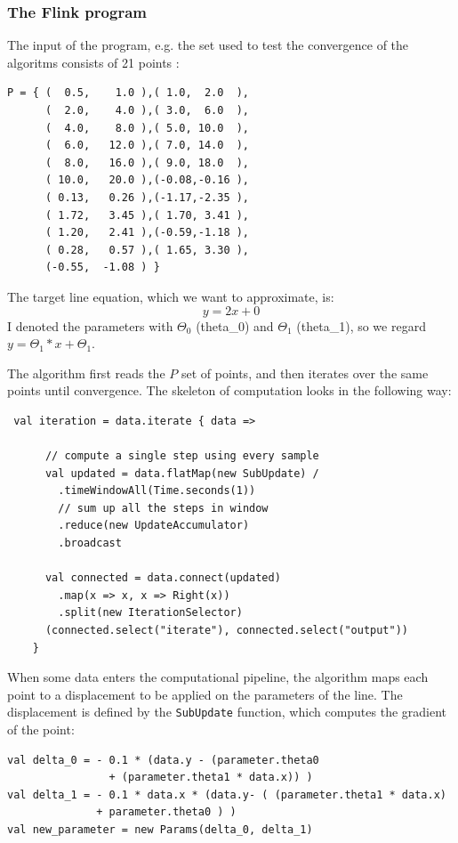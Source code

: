 \subsubsection{The Flink program}
The input of the program, e.g. the set used to test the convergence of the algoritms consists of 21 points :

{\small
\begin{verbatim}
P = { (  0.5,    1.0 ),( 1.0,  2.0  ),
      (  2.0,    4.0 ),( 3.0,  6.0  ),
      (  4.0,    8.0 ),( 5.0, 10.0  ),
      (  6.0,   12.0 ),( 7.0, 14.0  ),
      (  8.0,   16.0 ),( 9.0, 18.0  ),
      ( 10.0,   20.0 ),(-0.08,-0.16 ),
      ( 0.13,   0.26 ),(-1.17,-2.35 ),
      ( 1.72,   3.45 ),( 1.70, 3.41 ),
      ( 1.20,   2.41 ),(-0.59,-1.18 ),
      ( 0.28,   0.57 ),( 1.65, 3.30 ),
      (-0.55,  -1.08 ) }
\end{verbatim}
}

The target line equation, which we want to approximate, is:
\begin{equation}
 y=2x+0
\end{equation}
I denoted the parameters with $\Theta_0$ (theta\_0) and $\Theta_1$ (theta\_1), so we regard $y = \Theta_1*x+ \Theta_1$.

The algorithm first reads the $P$ set of points, and then iterates over the same points until convergence. The skeleton of computation looks in the following way:

{\small
\begin{verbatim}
 val iteration = data.iterate { data =>
      
      // compute a single step using every sample
      val updated = data.flatMap(new SubUpdate) /
        .timeWindowAll(Time.seconds(1))
        // sum up all the steps in window
        .reduce(new UpdateAccumulator) 
        .broadcast

      val connected = data.connect(updated)
        .map(x => x, x => Right(x))
        .split(new IterationSelector)
      (connected.select("iterate"), connected.select("output"))
    }
\end{verbatim}
}


When some data enters the computational pipeline, the algorithm maps each point to a displacement to be applied on the parameters of the line. The displacement is defined by the \verb:SubUpdate: function, which computes the gradient of the point:

{
\begin{verbatim}
val delta_0 = - 0.1 * (data.y - (parameter.theta0 
                + (parameter.theta1 * data.x)) )
val delta_1 = - 0.1 * data.x * (data.y- ( (parameter.theta1 * data.x) 
              + parameter.theta0 ) )
val new_parameter = new Params(delta_0, delta_1)
\end{verbatim}
}

